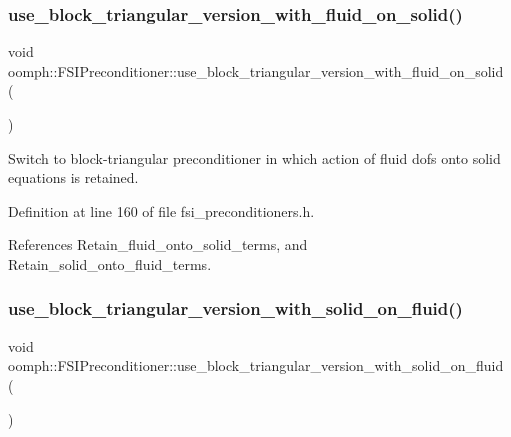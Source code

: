 \subsubsection{\texorpdfstring{use\+\_\+block\+\_\+triangular\+\_\+version\+\_\+with\+\_\+fluid\+\_\+on\+\_\+solid()}{use\_block\_triangular\_version\_with\_fluid\_on\_solid()}}
{\footnotesize\ttfamily void oomph\+::\+F\+S\+I\+Preconditioner\+::use\+\_\+block\+\_\+triangular\+\_\+version\+\_\+with\+\_\+fluid\+\_\+on\+\_\+solid (\begin{DoxyParamCaption}{ }\end{DoxyParamCaption})\hspace{0.3cm}{\ttfamily [inline]}}



Switch to block-\/triangular preconditioner in which action of fluid dofs onto solid equations is retained. 



Definition at line 160 of file fsi\+\_\+preconditioners.\+h.



References Retain\+\_\+fluid\+\_\+onto\+\_\+solid\+\_\+terms, and Retain\+\_\+solid\+\_\+onto\+\_\+fluid\+\_\+terms.

\mbox{\label{classoomph_1_1FSIPreconditioner_a193bbf986401ecb843e71581460004ad}} 
\subsubsection{\texorpdfstring{use\+\_\+block\+\_\+triangular\+\_\+version\+\_\+with\+\_\+solid\+\_\+on\+\_\+fluid()}{use\_block\_triangular\_version\_with\_solid\_on\_fluid()}}
{\footnotesize\ttfamily void oomph\+::\+F\+S\+I\+Preconditioner\+::use\+\_\+block\+\_\+triangular\+\_\+version\+\_\+with\+\_\+solid\+\_\+on\+\_\+fluid (\begin{DoxyParamCaption}{ }\end{DoxyParamCaption})\hspace{0.3cm}{\ttfamily [inline]}}



